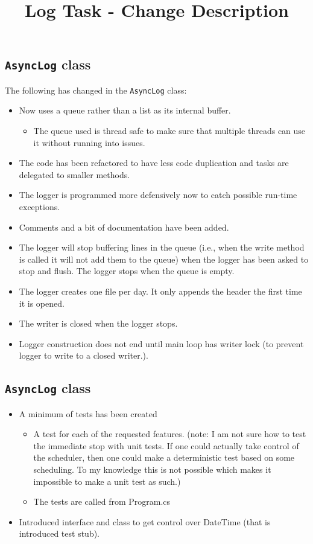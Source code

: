 \documentclass{article}
\title{Log Task - Change Description}
\begin{document}
\maketitle
\subsection*{\texttt{AsyncLog} class}
The following has changed in the \texttt{AsyncLog} class:
\begin{itemize}
\item Now uses a queue rather than a list as its internal buffer.
  \begin{itemize}
  \item The queue used is thread safe to make sure that multiple threads can use it without running into issues.
  \end{itemize}
\item The code has been refactored to have less code duplication and tasks are delegated to smaller methods.
\item The logger is programmed more defensively now to catch possible run-time exceptions.
\item Comments and a bit of documentation have been added.
\item The logger will stop buffering lines in the queue (i.e., when the write method is called it will not add them to the queue) when the logger has been asked to stop and flush. The logger stops when the queue is empty.
\item The logger creates one file per day. It only appends the header the first time it is opened.
\item The writer is closed when the logger stops.
\item Logger construction does not end until main loop has writer lock (to prevent logger to write to a closed writer.).
\end{itemize}

\subsection*{\texttt{AsyncLog} class}
\begin{itemize}
\item A minimum of tests has been created
  \begin{itemize}
  \item A test for each of the requested features. (note: I am not sure how to test the immediate stop with unit tests. If one could actually take control of the scheduler, then one could make a deterministic test based on some scheduling. To my knowledge this is not possible which makes it impossible to make a unit test as such.)
  \item The tests are called from Program.cs    
  \end{itemize}
\item Introduced interface and class to get control over DateTime (that is introduced test stub).
\end{itemize}
\end{document}
